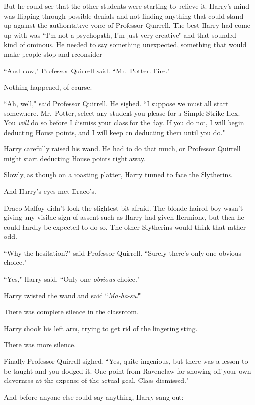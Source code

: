 But he could see that the other students were starting to believe it. Harry's mind was flipping through possible denials and not finding anything that could stand up against the authoritative voice of Professor Quirrell. The best Harry had come up with was ``I'm not a psychopath, I'm just very creative" and that sounded kind of ominous. He needed to say something unexpected, something that would make people stop and reconsider\---

``And now," Professor Quirrell said. ``Mr.~Potter. Fire."

Nothing happened, of course.

``Ah, well," said Professor Quirrell. He sighed. ``I suppose we must all start somewhere. Mr.~Potter, select any student you please for a Simple Strike Hex. You \emph{will} do so before I dismiss your class for the day. If you do not, I will begin deducting House points, and I will keep on deducting them until you do."

Harry carefully raised his wand. He had to do that much, or Professor Quirrell might start deducting House points right away.

Slowly, as though on a roasting platter, Harry turned to face the Slytherins.

And Harry's eyes met Draco's.

Draco Malfoy didn't look the slightest bit afraid. The blonde-haired boy wasn't giving any visible sign of assent such as Harry had given Hermione, but then he could hardly be expected to do so. The other Slytherins would think that rather odd.

``Why the hesitation?" said Professor Quirrell. ``Surely there's only one obvious choice."

``Yes," Harry said. ``Only one \emph{obvious} choice."

Harry twisted the wand and said ``\emph{Ma-ha-su!}"

There was complete silence in the classroom.

Harry shook his left arm, trying to get rid of the lingering sting.

There was more silence.

Finally Professor Quirrell sighed. ``Yes, quite ingenious, but there was a lesson to be taught and you dodged it. One point from Ravenclaw for showing off your own cleverness at the expense of the actual goal. Class dismissed."

And before anyone else could say anything, Harry sang out:

